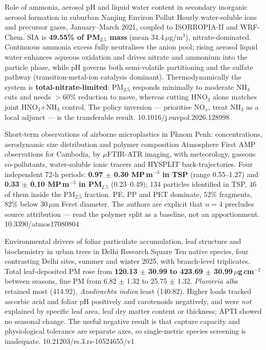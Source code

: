 \documentclass[10pt]{article}
\begin{document}

{Role of ammonia, aerosol pH and liquid water content in secondary inorganic aerosol formation in suburban Nanjing}
{Environ Pollut}
{Hourly water-soluble ions and precursor gases, January--March 2021, coupled to
ISORROPIA-II and WRF-Chem. SIA is \textbf{49.55\% of PM$_{2.5}$ mass} (mean
34.4\,$\mu$g/m$^3$), nitrate-dominated. Continuous ammonia excess fully neutralises the
anion pool; rising aerosol liquid water enhances aqueous oxidation and drives nitrate and
ammonium into the particle phase, while pH governs both semi-volatile partitioning and
the sulfate pathway (transition-metal-ion catalysis dominant). Thermodynamically the
system is \textbf{total-nitrate-limited}: PM$_{2.5}$ responds minimally to moderate
NH$_3$ cuts and needs $>$60\% reduction to move, whereas cutting HNO$_3$ alone matches
joint HNO$_3$+NH$_3$ control. The policy inversion --- prioritise NO$_x$, treat NH$_3$ as
a local adjunct --- is the transferable result.}
{10.1016/j.envpol.2026.128998}

{Short-term observations of airborne microplastics in Phnom Penh: concentrations, aerodynamic size distribution and polymer composition}
{Atmosphere}
{First AMP observations for Cambodia, by $\mu$FTIR-ATR imaging, with meteorology,
gaseous co-pollutants, water-soluble ionic tracers and HYSPLIT back-trajectories.
Four independent 72-h periods: \textbf{0.97 $\pm$ 0.30 MP\,m$^{-3}$ in TSP} (range
0.55--1.27) and \textbf{0.33 $\pm$ 0.10 MP\,m$^{-3}$ in PM$_{2.5}$} (0.23--0.49);
134 particles identified in TSP, 46 of them inside the PM$_{2.5}$ fraction. PE, PP and
PET dominate, 52\% fragments, 82\% below 30\,$\mu$m Feret diameter. The authors are
explicit that $n = 4$ precludes source attribution --- read the polymer split as a
baseline, not an apportionment.}
{10.3390/atmos17080804}

{Environmental drivers of foliar particulate accumulation, leaf structure and biochemistry in urban trees in Delhi}
{Research Square}
{Ten native species, four contrasting Delhi sites, summer and winter 2025, with
branch-level triplicates. Total leaf-deposited PM rose from \textbf{120.13 $\pm$ 30.99 to
423.69 $\pm$ 30.99\,$\mu$g\,cm$^{-2}$} between seasons, fine PM from 6.82 $\pm$ 1.32 to
25.75 $\pm$ 1.32. \textit{Plumeria alba} retained most (414.92), \textit{Azadirachta
indica} least (140.82). Higher loads tracked ascorbic acid and foliar pH positively and
carotenoids negatively, and were \emph{not} explained by specific leaf area, leaf dry
matter content or thickness; APTI showed no seasonal change. The useful negative result
is that capture capacity and physiological tolerance are separate axes, so single-metric
species screening is inadequate.}
{10.21203/rs.3.rs-10524655/v1}
\end{document}
